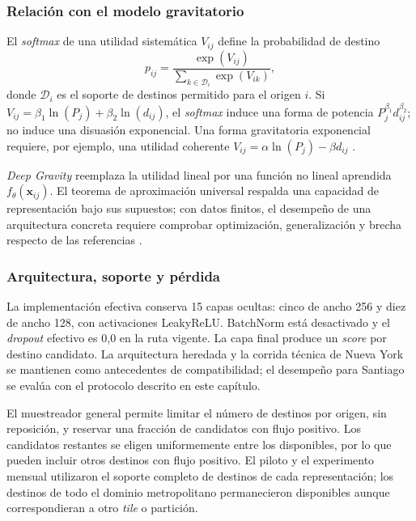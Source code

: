 \subsubsection{Relación con el modelo gravitatorio}

El \textit{softmax} de una utilidad sistemática $V_{ij}$ define la probabilidad de destino
\begin{equation}
    p_{ij} = \frac{\exp(V_{ij})}{\sum_{k \in \mathcal{D}_i} \exp(V_{ik})},
    \label{eq:logit_dest}
\end{equation}
donde $\mathcal{D}_i$ es el soporte de destinos permitido para el origen $i$. Si $V_{ij}=\beta_1\ln(P_j)+\beta_2\ln(d_{ij})$, el \textit{softmax} induce una forma de potencia $P_j^{\beta_1}d_{ij}^{\beta_2}$; no induce una disuasión exponencial. Una forma gravitatoria exponencial requiere, por ejemplo, una utilidad coherente $V_{ij}=\alpha\ln(P_j)-\beta d_{ij}$ \cite{mcfadden1974conditional,ortuzar2011modelling}.

\textit{Deep Gravity} reemplaza la utilidad lineal por una función no lineal aprendida $f_\theta(\mathbf{x}_{ij})$. El teorema de aproximación universal respalda una capacidad de representación bajo sus supuestos; con datos finitos, el desempeño de una arquitectura concreta requiere comprobar optimización, generalización y brecha respecto de las referencias \cite{hornik1991approximation}.

\subsubsection{Arquitectura, soporte y pérdida}

La implementación efectiva conserva 15 capas ocultas: cinco de ancho 256 y diez de ancho 128, con activaciones LeakyReLU. BatchNorm está desactivado y el \textit{dropout} efectivo es 0,0 en la ruta vigente. La capa final produce un \textit{score} por destino candidato. La arquitectura heredada y la corrida técnica de Nueva York se mantienen como antecedentes de compatibilidad; el desempeño para Santiago se evalúa con el protocolo descrito en este capítulo.

El muestreador general permite limitar el número de destinos por origen, sin reposición, y reservar una fracción de candidatos con flujo positivo. Los candidatos restantes se eligen uniformemente entre los disponibles, por lo que pueden incluir otros destinos con flujo positivo. El piloto y el experimento mensual utilizaron el soporte completo de destinos de cada representación; los destinos de todo el dominio metropolitano permanecieron disponibles aunque correspondieran a otro \textit{tile} o partición.

